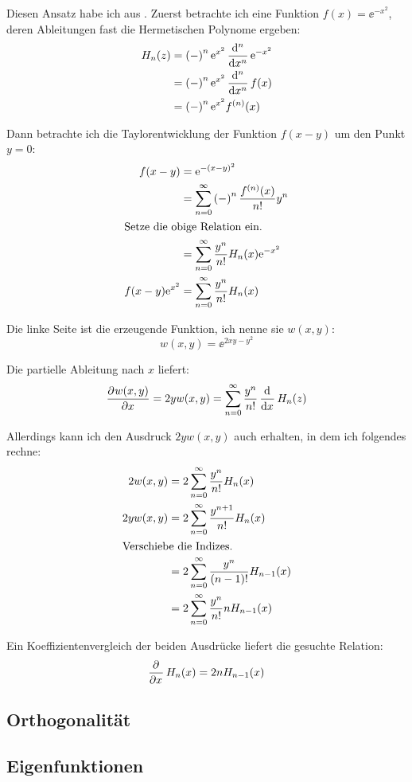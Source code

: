 Diesen Ansatz habe ich aus \cite{koeppel-hermite_beiblatt}. Zuerst betrachte
ich eine Funktion $f(x) = \ee^{-x^2}$, deren Ableitungen fast die Hermetischen
Polynome ergeben:
\begin{align*}
	H_n(z)
	&= \del-^n \ee^{x^2} \dod[n]{}x \ee^{-x^2} \\
	&= \del-^n \ee^{x^2} \dod[n]{}x f(x) \\
	&= \del-^n \ee^{x^2} f^{(n)}(x)
\end{align*}

Dann betrachte ich die Taylorentwicklung der Funktion $f(x - y)$ um den Punkt
$y = 0$:
\begin{align*}
	f(x - y)
	&= \ee^{-(x-y)^2} \\
	&= \sum_{n=0}^\infty \del-^n \frac{f^{(n)}(x)}{n!} y^n \\
	\intertext{%
		Setze die obige Relation ein.
	}
	&= \sum_{n=0}^\infty \frac{y^n}{n!} H_n(x) \ee^{-x^2} \\
	f(x-y) \ee^{x^2} 
	&= \sum_{n=0}^\infty \frac{y^n}{n!} H_n(x)
\end{align*}

Die linke Seite ist die erzeugende Funktion, ich nenne sie $w(x, y)$:
\[
	w(x, y) = \ee^{2xy-y^2}
\]

Die partielle Ableitung nach $x$ liefert:
\[
	\dpd{w(x, y)}x = 2 y w(x, y)
	= \sum_{n=0}^\infty \frac{y^n}{n!} \dod{}x H_n(z)
\]

Allerdings kann ich den Ausdruck $2 y w(x, y)$ auch erhalten, in dem ich
folgendes rechne:
\begin{align*}
	2 w(x, y)
	&= 2 \sum_{n=0}^\infty \frac{y^n}{n!} H_n(x) \\
	2 y w(x, y)
	&= 2 \sum_{n=0}^\infty \frac{y^{n+1}}{n!} H_n(x) \\
	\intertext{%
		Verschiebe die Indizes.
	}
	&= 2 \sum_{n=0}^\infty \frac{y^{n}}{(n-1)!} H_{n-1}(x) \\
	&= 2 \sum_{n=0}^\infty \frac{y^{n}}{n!} n H_{n-1}(x)
\end{align*}

Ein Koeffizientenvergleich der beiden Ausdrücke liefert die gesuchte Relation:
\[
	\dpd{}x H_n(x) = 2n H_{n-1}(x)
\]

\subsection{Orthogonalität}
\subsection{Eigenfunktionen}
